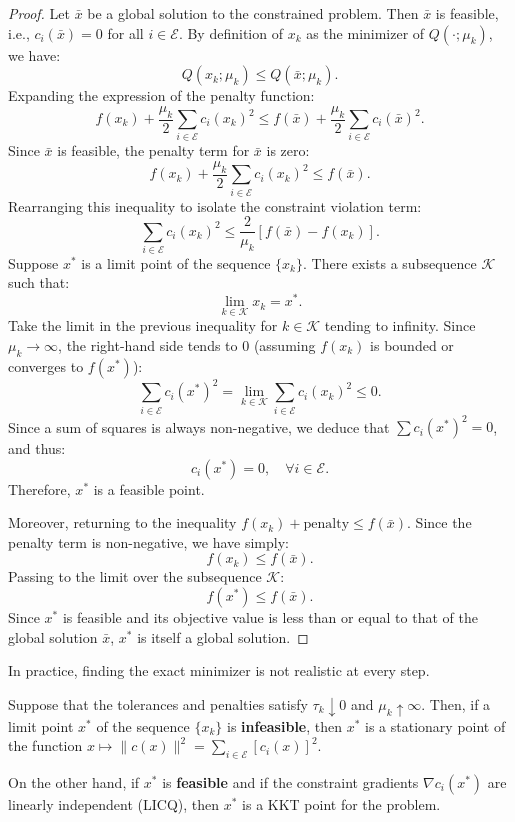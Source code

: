 \begin{proof}
    Let $\bar{x}$ be a global solution to the constrained problem.
    Then $\bar{x}$ is feasible, i.e., $c_i(\bar{x}) = 0$ for all $i \in \mathcal{E}$.
    By definition of $x_k$ as the minimizer of $Q(\cdot; \mu_k)$, we have:
    \[
        Q(x_k; \mu_k) \le Q(\bar{x}; \mu_k).
    \]
    Expanding the expression of the penalty function:
    \[
        f(x_k) + \frac{\mu_k}{2} \sum_{i \in \mathcal{E}} c_i(x_k)^2 \le f(\bar{x}) + \frac{\mu_k}{2} \sum_{i \in \mathcal{E}} c_i(\bar{x})^2.
    \]
    Since $\bar{x}$ is feasible, the penalty term for $\bar{x}$ is zero:
    \[
        f(x_k) + \frac{\mu_k}{2} \sum_{i \in \mathcal{E}} c_i(x_k)^2 \le f(\bar{x}).
    \]
    Rearranging this inequality to isolate the constraint violation term:
    \[
        \sum_{i \in \mathcal{E}} c_i(x_k)^2 \le \frac{2}{\mu_k} [f(\bar{x}) - f(x_k)].
    \]
    Suppose $x^*$ is a limit point of the sequence $\{x_k\}$. There exists a subsequence $\mathcal{K}$ such that:
    \[
        \lim_{k \in \mathcal{K}} x_k = x^*.
    \]
    Take the limit in the previous inequality for $k \in \mathcal{K}$ tending to infinity. Since $\mu_k \to \infty$, the right-hand side tends to 0 (assuming $f(x_k)$ is bounded or converges to $f(x^*)$):
    \[
        \sum_{i \in \mathcal{E}} c_i(x^*)^2 = \lim_{k \in \mathcal{K}} \sum_{i \in \mathcal{E}} c_i(x_k)^2 \le 0.
    \]
    Since a sum of squares is always non-negative, we deduce that $\sum c_i(x^*)^2 = 0$, and thus:
    \[
        c_i(x^*) = 0, \quad \forall i \in \mathcal{E}.
    \]
    Therefore, $x^*$ is a feasible point.
    
    Moreover, returning to the inequality $f(x_k) + \text{penalty} \le f(\bar{x})$. Since the penalty term is non-negative, we have simply:
    \[
        f(x_k) \le f(\bar{x}).
    \]
    Passing to the limit over the subsequence $\mathcal{K}$:
    \[
        f(x^*) \le f(\bar{x}).
    \]
    Since $x^*$ is feasible and its objective value is less than or equal to that of the global solution $\bar{x}$, $x^*$ is itself a global solution.
\end{proof}

\begin{remarque}
    In practice, finding the exact minimizer is not realistic at every step.
\end{remarque}

\begin{theoreme}
    Suppose that the tolerances and penalties satisfy $\tau_k \downarrow 0$ and $\mu_k \uparrow \infty$.
    Then, if a limit point $x^*$ of the sequence $\{x_k\}$ is \textbf{infeasible}, then $x^*$ is a stationary point of the function $x \mapsto \|c(x)\|^2 = \sum_{i \in \mathcal{E}} [c_i(x)]^2$.
    
    On the other hand, if $x^*$ is \textbf{feasible} and if the constraint gradients $\nabla c_i(x^*)$ are linearly independent (LICQ), then $x^*$ is a KKT point for the problem.
\end{theoreme}

